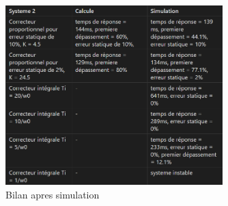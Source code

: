 \documentclass[12pt, a4paper]{report}
\begin{document}
\begin{figure}[H]
    \centering
    \includegraphics[width=0.75\textwidth]{bilan3.png}
    \caption{Bilan apres simulation}
\end{figure}
\end{document}
